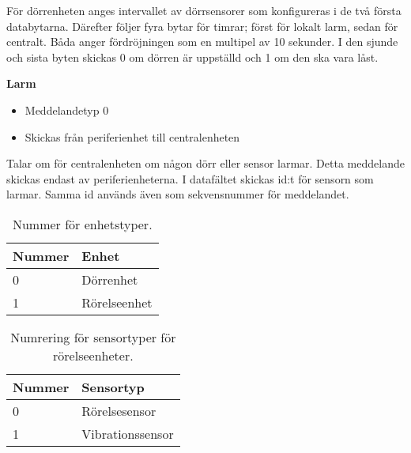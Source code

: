 För dörrenheten anges intervallet av dörrsensorer som konfigureras i de två första databytarna. Därefter följer fyra bytar för timrar; först för lokalt larm, sedan för centralt. Båda anger fördröjningen som en multipel av 10 sekunder. I den sjunde och sista byten skickas 0 om dörren är uppställd och 1 om den ska vara låst.

\textbf{Larm}
\begin{itemize}
	\item Meddelandetyp 0
	\item Skickas från periferienhet till centralenheten
\end{itemize}	
Talar om för centralenheten om någon dörr eller sensor larmar. Detta meddelande skickas endast av periferienheterna. I datafältet skickas id:t för sensorn som larmar. Samma id används även som sekvensnummer för meddelandet.\\


\begin{table}[htb]
	\centering
	\begin{tabular}{|l|l|}
		\hline
		Nummer & Enhet \\ \hline \hline
		0 & Dörrenhet \\ \hline
		1 & Rörelseenhet \\ \hline

	\end{tabular}
	\caption{Nummer för enhetstyper.}
	\label{tab:enhetstyper}
\end{table}

\begin{table}[htb]
	\centering
	\begin{tabular}{|l|l|}
		\hline
		Nummer & Sensortyp \\ \hline \hline
		0 & Rörelsesensor \\ \hline
		1 & Vibrationssensor \\ \hline

	\end{tabular}
	\caption{Numrering för sensortyper för rörelseenheter.}
	\label{tab:sensortyper}
\end{table}

